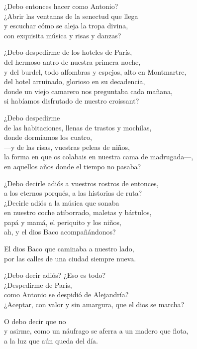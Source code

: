\documentclass[12pt,twoside]{article}
\begin{document}
\begin{poem}
\begin{stanza}
¿Debo entonces hacer como Antonio?\\
¿Abrir las ventanas de la senectud que llega\\
y escuchar cómo se aleja la tropa divina,\\
con exquisita música y risas y danzas?
\end{stanza}
\begin{stanza}
¿Debo despedirme de los hoteles de París,\\
del hermoso antro de nuestra primera noche,\\
y del burdel, todo alfombras y espejos, alto en Montmartre,\\
del hotel arruinado, glorioso en su decadencia,\\
donde un viejo camarero nos preguntaba cada mañana,\\
si habíamos disfrutado de nuestro croissant?
\end{stanza}
\begin{stanza}
¿Debo despedirme\\
de las habitaciones, llenas de trastos y mochilas,\\
donde dormíamos los cuatro,\\
---y de las risas, vuestras peleas de niños,\\
la forma en que os colabais en nuestra cama de madrugada---,\\
en aquellos años donde el tiempo no pasaba?
\end{stanza}
\begin{stanza}
¿Debo decirle adiós a vuestros rostros de entonces,\\
a los eternos porqués, a las historias de ruta?\\
¿Decirle adiós a la música que sonaba\\
en nuestro coche atiborrado, maletas y bártulos,\\
papá y mamá, el periquito y los niños,\\
ah, y el dios Baco acompañándonos?
\end{stanza}
\begin{stanza}
El dios Baco que caminaba a nuestro lado,\\
por las calles de una ciudad siempre nueva.
\end{stanza}
\begin{stanza}
¿Debo decir adiós? ¿Eso es todo?\\
¿Despedirme de París,\\
como Antonio se despidió de Alejandría?\\
¿Aceptar, con valor y sin amargura, que el dios se marcha?
\end{stanza}
\begin{stanza}
O debo decir que no\\
y asirme, como un náufrago se aferra a un madero que flota,\\
a la luz que aún queda del día.
\end{stanza}
\end{poem}
\end{document}

